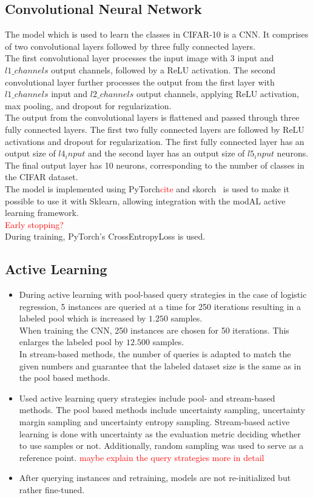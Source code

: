 \documentclass{article}
\theoremstyle{plain}
\theoremstyle{definition}
\theoremstyle{remark}
\begin{document}
\subsection{Convolutional Neural Network}
The model which is used to learn the classes in CIFAR-10 is a CNN. It comprises of two convolutional layers followed by three fully connected layers. \\
The first convolutional layer processes the input image with 3 input and $l1\_channels$ output channels, followed by a ReLU activation. The second convolutional layer further processes the output from the first layer with $l1\_channels$ input and $l2\_channels$ output channels, applying ReLU activation, max pooling, and dropout for regularization.
\\
The output from the convolutional layers is flattened and passed through three fully connected layers. The first two fully connected layers are followed by ReLU activations and dropout for regularization. The first fully connected layer has an output size of $l4_input$ and the second layer has an output size of $l5_input$ neurons. The final output layer has 10 neurons, corresponding to the number of classes in the CIFAR dataset.
\\
The model is implemented using PyTorch\textcolor{red}{cite} and skorch~\cite{skorch} is used to make it possible to use it with Sklearn, allowing integration with the modAL active learning framework.
\\
\textcolor{red}{Early stopping?}
\\
During training, PyTorch's CrossEntropyLoss is used. 

\subsection{Active Learning}
\begin{itemize}
	\item During active learning with pool-based query strategies in the case of logistic regression, 5 instances are queried at a time for 250 iterations resulting in a labeled pool which is increased by $1.250$ samples. \\
	When training the CNN, 250 instances are chosen for 50 iterations. This enlarges the labeled pool by $12.500$ samples. \\
	In stream-based methods, the number of queries is adapted to match the given numbers and guarantee that the labeled dataset size is the same as in the pool based methods. 
	\item Used active learning query strategies include pool- and stream-based methods. The pool based methods include uncertainty sampling, uncertainty margin sampling and uncertainty entropy sampling. Stream-based active learning is done with uncertainty as the evaluation metric deciding whether to use samples or not. Additionally, random sampling was used to serve as a reference point.  
	\textcolor{red}{maybe explain the query strategies more in detail}
	\item After querying instances and retraining, models are not re-initialized but rather fine-tuned. 
\end{itemize}
\end{document}
